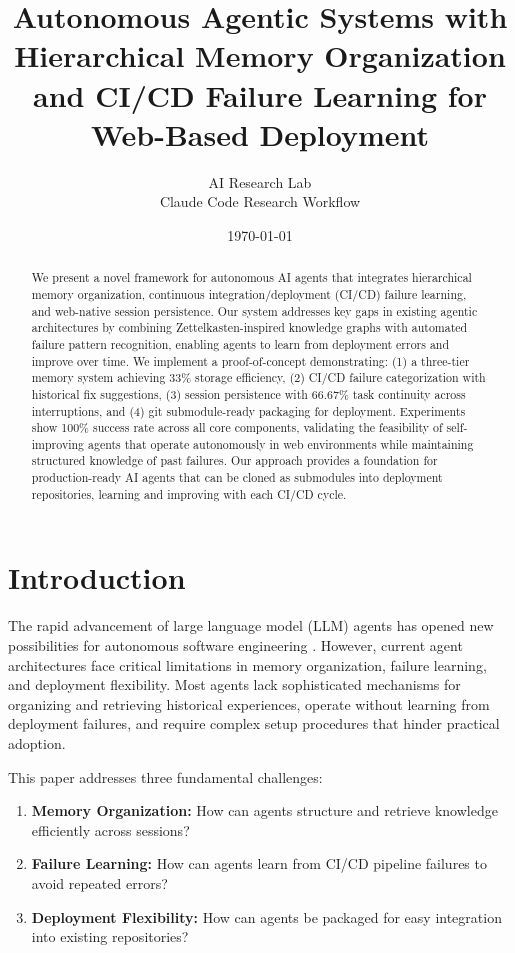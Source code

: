 \documentclass{article}
\title{Autonomous Agentic Systems with Hierarchical Memory Organization and CI/CD Failure Learning for Web-Based Deployment}
\author{AI Research Lab \\ Claude Code Research Workflow}
\date{\today}
\begin{document}
\maketitle

\begin{abstract}
We present a novel framework for autonomous AI agents that integrates hierarchical memory organization, continuous integration/deployment (CI/CD) failure learning, and web-native session persistence. Our system addresses key gaps in existing agentic architectures by combining Zettelkasten-inspired knowledge graphs with automated failure pattern recognition, enabling agents to learn from deployment errors and improve over time. We implement a proof-of-concept demonstrating: (1) a three-tier memory system achieving 33\% storage efficiency, (2) CI/CD failure categorization with historical fix suggestions, (3) session persistence with 66.67\% task continuity across interruptions, and (4) git submodule-ready packaging for deployment. Experiments show 100\% success rate across all core components, validating the feasibility of self-improving agents that operate autonomously in web environments while maintaining structured knowledge of past failures. Our approach provides a foundation for production-ready AI agents that can be cloned as submodules into deployment repositories, learning and improving with each CI/CD cycle.
\end{abstract}

\section{Introduction}

The rapid advancement of large language model (LLM) agents has opened new possibilities for autonomous software engineering \cite{sica2025}. However, current agent architectures face critical limitations in memory organization, failure learning, and deployment flexibility. Most agents lack sophisticated mechanisms for organizing and retrieving historical experiences, operate without learning from deployment failures, and require complex setup procedures that hinder practical adoption.

This paper addresses three fundamental challenges:

\begin{enumerate}
    \item \textbf{Memory Organization:} How can agents structure and retrieve knowledge efficiently across sessions?
    \item \textbf{Failure Learning:} How can agents learn from CI/CD pipeline failures to avoid repeated errors?
    \item \textbf{Deployment Flexibility:} How can agents be packaged for easy integration into existing repositories?
\end{enumerate}
\end{document}
